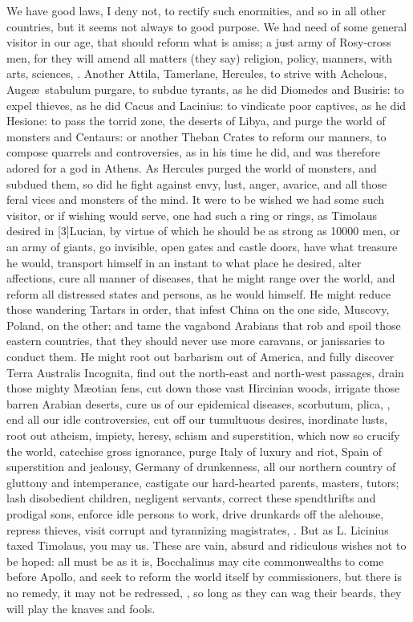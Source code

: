 We have good laws, I deny not, to rectify such enormities, and so in
all other countries, but it seems not always to good purpose. We had
need of some general visitor in our age, that should reform what is
amiss; a just army of Rosy-cross men, for they will amend all matters
(they say) religion, policy, manners, with arts, sciences, \etc{}. Another
Attila, Tamerlane, Hercules, to strive with Achelous, Auge\ae{}\ stabulum
purgare, to subdue tyrants, as he did Diomedes and Busiris: to
expel thieves, as he did Cacus and Lacinius: to vindicate poor
captives, as he did Hesione: to pass the torrid zone, the deserts of
Libya, and purge the world of monsters and Centaurs: or another Theban
Crates to reform our manners, to compose quarrels and controversies, as
in his time he did, and was therefore adored for a god in Athens. As
Hercules purged the world of monsters, and subdued them, so did he
fight against envy, lust, anger, avarice, \etc{} and all those feral vices
and monsters of the mind. It were to be wished we had some such
visitor, or if wishing would serve, one had such a ring or rings, as
Timolaus desired in [3\baselineskip]Lucian, by virtue of which he should be as
strong as 10\thinspace{}000 men, or an army of giants, go invisible, open gates
and castle doors, have what treasure he would, transport himself in an
instant to what place he desired, alter affections, cure all manner of
diseases, that he might range over the world, and reform all distressed
states and persons, as he would himself. He might reduce those
wandering Tartars in order, that infest China on the one side, Muscovy,
Poland, on the other; and tame the vagabond Arabians that rob and spoil
those eastern countries, that they should never use more caravans, or
janissaries to conduct them. He might root out barbarism out of
America, and fully discover Terra Australis Incognita, find out the
north-east and north-west passages, drain those mighty M\ae{}otian fens,
cut down those vast Hircinian woods, irrigate those barren Arabian
deserts, \etc{} cure us of our epidemical diseases, scorbutum, plica,
, \etc{} end all our idle controversies, cut off our
tumultuous desires, inordinate lusts, root out atheism, impiety,
heresy, schism and superstition, which now so crucify the world,
catechise gross ignorance, purge Italy of luxury and riot, Spain of
superstition and jealousy, Germany of drunkenness, all our northern
country of gluttony and intemperance, castigate our hard-hearted
parents, masters, tutors; lash disobedient children, negligent
servants, correct these spendthrifts and prodigal sons, enforce idle
persons to work, drive drunkards off the alehouse, repress thieves,
visit corrupt and tyrannizing magistrates, \etc{}. But as L. Licinius taxed
Timolaus, you may us. These are vain, absurd and ridiculous wishes not
to be hoped: all must be as it is, Bocchalinus may cite
commonwealths to come before Apollo, and seek to reform the world
itself by commissioners, but there is no remedy, it may not be
redressed, ,
so long as they can wag their beards, they will play the knaves and
fools.

